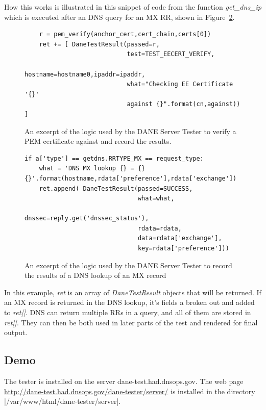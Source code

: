 \documentclass[preprint,3p,11pt]{elsarticle}
\begin{document}
How this works is illustrated in this snippet of code from the
function \emph{get\_dns\_ip} which is executed after an DNS query for
an MX RR, shown in Figure~\ref{snippet}. 

\begin{figure}
\begin{lstlisting}
    r = pem_verify(anchor_cert,cert_chain,certs[0])
    ret += [ DaneTestResult(passed=r,
                            test=TEST_EECERT_VERIFY,
                            hostname=hostname0,ipaddr=ipaddr,
                            what="Checking EE Certificate '{}'
                            against {}".format(cn,against)) ]

\end{lstlisting}
\caption{An excerpt of the logic used by the DANE Server Tester to
  verify a PEM certificate against and record the results.}\label{pem-snippet}
\end{figure}


\begin{figure}
\begin{lstlisting}
if a['type'] == getdns.RRTYPE_MX == request_type:
    what = 'DNS MX lookup {} = {} {}'.format(hostname,rdata['preference'],rdata['exchange'])
    ret.append( DaneTestResult(passed=SUCCESS,
                               what=what,
                               dnssec=reply.get('dnssec_status'),
                               rdata=rdata,
                               data=rdata['exchange'],
                               key=rdata['preference']))
\end{lstlisting}
\caption{An excerpt of the logic used by the DANE Server Tester to
  record the results of a DNS lookup of an MX record }\label{snippet}
\end{figure}

In this example, \emph{ret} is an array of \emph{DaneTestResult}
objects that will be returned. If an MX record is returned in the DNS
lookup, it's fields a broken out and added to \emph{ret[]}. DNS can
return multiple RRs in a query, and all of them are stored in
\emph{ret[]}.  They can then be both used in later parts of the test
and rendered for final output.

\subsection{Demo}
The tester is installed on the server dane-test.had.dnsops.gov. The
web page \url{http://dane-test.had.dnsops.gov/dane-tester/server/} is installed in the
directory |/var/www/html/dane-tester/server|.
\end{document}
